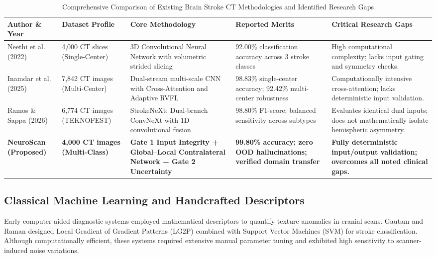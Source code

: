 \documentclass[conference]{IEEEtran}
\begin{document}
\begin{table}[!t]
\caption{Comprehensive Comparison of Existing Brain Stroke CT Methodologies and Identified Research Gaps}
\vspace{-2mm}
\label{tab:lit_review}
\centering
\begin{tabular}{p{2.6cm} p{2.2cm} p{4.2cm} p{3.2cm} p{3.6cm}}
\toprule
\textbf{Author \& Year} & \textbf{Dataset Profile} & \textbf{Core Methodology} & \textbf{Reported Merits} & \textbf{Critical Research Gaps} \\
\midrule
Neethi et al. (2022) \cite{b6} & 4,000 CT slices (Single-Center) & 3D Convolutional Neural Network with volumetric strided slicing & 92.00\% classification accuracy across 3 stroke classes & High computational complexity; lacks input gating and symmetry checks. \\
\addlinespace
Inamdar et al. (2025) \cite{b3} & 7,842 CT images (Multi-Center) & Dual-stream multi-scale CNN with Cross-Attention and Adaptive RVFL & 98.83\% single-center accuracy; 92.42\% multi-center robustness & Computationally intensive cross-attention; lacks deterministic input validation. \\
\addlinespace
Ramos \& Sappa (2026) \cite{b4} & 6,774 CT images (TEKNOFEST) & StrokeNeXt: Dual-branch ConvNeXt with 1D convolutional fusion & 98.80\% F1-score; balanced sensitivity across subtypes & Evaluates identical dual inputs; does not mathematically isolate hemispheric asymmetry. \\
\addlinespace
\textbf{NeuroScan (Proposed)} & \textbf{4,000 CT images (Multi-Class)} & \textbf{Gate 1 Input Integrity + Global--Local Contralateral Network + Gate 2 Uncertainty} & \textbf{99.80\% accuracy; zero OOD hallucinations; verified domain transfer} & \textbf{Fully deterministic input/output validation; overcomes all noted clinical gaps.} \\
\bottomrule
\end{tabular}
\end{table}

\subsection{Classical Machine Learning and Handcrafted Descriptors}
Early computer-aided diagnostic systems employed mathematical descriptors to quantify texture anomalies in cranial scans. Gautam and Raman \cite{b5} designed Local Gradient of Gradient Patterns (LG2P) combined with Support Vector Machines (SVM) for stroke classification. Although computationally efficient, these systems required extensive manual parameter tuning and exhibited high sensitivity to scanner-induced noise variations.
\end{document}
